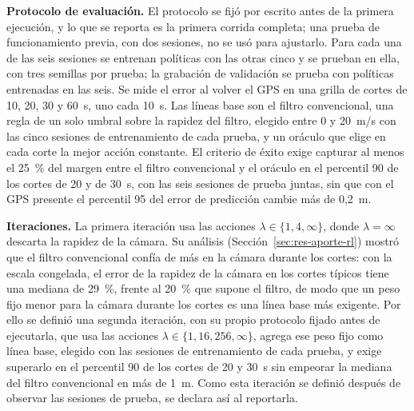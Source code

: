 \textbf{Protocolo de evaluación.}
El protocolo se fijó por escrito antes de la primera ejecución, y lo que se reporta es la primera corrida completa; una prueba de funcionamiento previa, con dos sesiones, no se usó para ajustarlo.
Para cada una de las seis sesiones se entrenan políticas con las otras cinco y se prueban en ella, con tres semillas por prueba; la grabación de validación se prueba con políticas entrenadas en las seis.
Se mide el error al volver el GPS en una grilla de cortes de 10, 20, 30 y 60~s, uno cada 10~s.
Las líneas base son el filtro convencional, una regla de un solo umbral sobre la rapidez del filtro, elegido entre 0 y 20~m/s con las cinco sesiones de entrenamiento de cada prueba, y un oráculo que elige en cada corte la mejor acción constante.
El criterio de éxito exige capturar al menos el 25~\% del margen entre el filtro convencional y el oráculo en el percentil 90 de los cortes de 20 y de 30~s, con las seis sesiones de prueba juntas, sin que con el GPS presente el percentil 95 del error de predicción cambie más de 0,2~m.

\textbf{Iteraciones.}
La primera iteración usa las acciones $\lambda \in \{1, 4, \infty\}$, donde $\lambda = \infty$ descarta la rapidez de la cámara.
Su análisis (Sección~\ref{sec:res-aporte-rl}) mostró que el filtro convencional confía de más en la cámara durante los cortes: con la escala congelada, el error de la rapidez de la cámara en los cortes típicos tiene una mediana de 29~\%, frente al 20~\% que supone el filtro, de modo que un peso fijo menor para la cámara durante los cortes es una línea base más exigente.
Por ello se definió una segunda iteración, con su propio protocolo fijado antes de ejecutarla, que usa las acciones $\lambda \in \{1, 16, 256, \infty\}$, agrega ese peso fijo como línea base, elegido con las sesiones de entrenamiento de cada prueba, y exige superarlo en el percentil 90 de los cortes de 20 y 30~s sin empeorar la mediana del filtro convencional en más de 1~m.
Como esta iteración se definió después de observar las sesiones de prueba, se declara así al reportarla.

